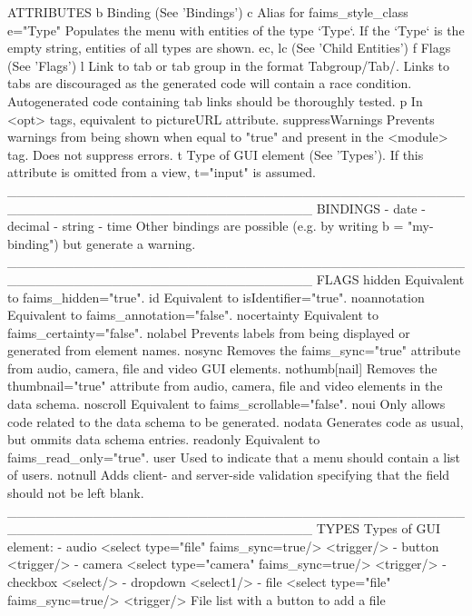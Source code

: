 ATTRIBUTES\crlf
\crlf
b Binding (See 'Bindings')\crlf
c Alias for faims_style_class\crlf
e="Type" Populates the menu with entities of the type `Type`. If the\crlf
`Type` is the empty string, entities of all types are shown.\crlf
ec, lc (See 'Child Entities')\crlf
f Flags (See 'Flags')\crlf
l Link to tab or tab group in the format Tabgroup/Tab/. Links\crlf
to tabs are discouraged as the generated code will contain\crlf
a race condition. Autogenerated code containing tab links\crlf
should be thoroughly tested.\crlf
p In <opt> tags, equivalent to pictureURL attribute.\crlf
suppressWarnings Prevents warnings from being shown when equal to "true" and\crlf
present in the <module> tag. Does not suppress errors.\crlf
t Type of GUI element (See 'Types'). If this attribute is\crlf
omitted from a view, t="input" is assumed.\crlf
________________________________________________________________________________\crlf
\crlf
BINDINGS\crlf
\crlf
- date\crlf
- decimal\crlf
- string\crlf
- time\crlf
Other bindings are possible (e.g. by writing b = "my-binding") but generate a\crlf
warning.\crlf
________________________________________________________________________________\crlf
\crlf
FLAGS\crlf
\crlf
hidden Equivalent to faims_hidden="true".\crlf
id Equivalent to isIdentifier="true".\crlf
noannotation Equivalent to faims_annotation="false".\crlf
nocertainty Equivalent to faims_certainty="false".\crlf
nolabel Prevents labels from being displayed or generated from element\crlf
names.\crlf
nosync Removes the faims_sync="true" attribute from audio, camera,\crlf
file and video GUI elements.\crlf
nothumb{[}nail{]} Removes the thumbnail="true" attribute from audio, camera,\crlf
file and video elements in the data schema.\crlf
noscroll Equivalent to faims_scrollable="false".\crlf
noui Only allows code related to the data schema to be generated.\crlf
nodata Generates code as usual, but ommits data schema entries.\crlf
readonly Equivalent to faims_read_only="true".\crlf
user Used to indicate that a menu should contain a list of users.\crlf
notnull Adds client- and server-side validation specifying that the\crlf
field should not be left blank.\crlf
________________________________________________________________________________\crlf
\crlf
TYPES\crlf
\crlf
Types of GUI element:\crlf
- audio <select type="file" faims_sync=true/>\crlf
<trigger/>\crlf
- button <trigger/>\crlf
- camera <select type="camera" faims_sync=true/>\crlf
<trigger/>\crlf
- checkbox <select/>\crlf
- dropdown <select1/>\crlf
- file <select type="file" faims_sync=true/>\crlf
<trigger/>\crlf
File list with a button to add a file\crlf
